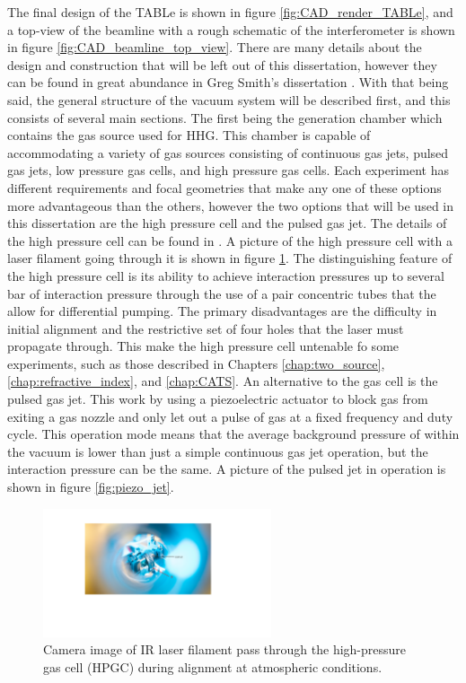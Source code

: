 The final design of the TABLe is shown in figure \ref{fig:CAD_render_TABLe}, and a top-view of the beamline with a rough schematic of the interferometer is shown in figure \ref{fig:CAD_beamline_top_view}. There are many details about the design and construction that will be left out of this dissertation, however they can be found in great abundance in Greg Smith's dissertation \cite{smithApplicationAttosecondTechniques2020}.  With that being said, the general structure of the vacuum system will be described first, and this consists of several main sections.  The first being the generation chamber which contains the gas source used for HHG.  This chamber is capable of accommodating a variety of gas sources consisting of continuous gas jets, pulsed gas jets, low pressure gas cells, and high pressure gas cells.  Each experiment has different requirements and focal geometries that make any one of these options more advantageous than the others, however the two options that will be used in this dissertation are the high pressure cell and the pulsed gas jet.  The details of the high pressure cell can be found in \cite{smithApplicationAttosecondTechniques2020}.  A picture of the high pressure cell with a laser filament going through it is shown in figure \ref{fig:HPGC_filament}.  The distinguishing feature of the high pressure cell is its ability to achieve interaction pressures up to several bar of interaction pressure through the use of a pair concentric tubes that the allow for differential pumping.  The primary disadvantages are the difficulty in initial alignment and the restrictive set of four holes that the laser must propagate through.  This make the high pressure cell untenable fo some experiments, such as those described in Chapters \ref{chap:two_source}, \ref{chap:refractive_index}, and \ref{chap:CATS}.  An alternative to the gas cell is the pulsed gas jet.  This work by using a piezoelectric actuator to block gas from exiting a gas nozzle and only let out a pulse of gas at a fixed frequency and duty cycle.  This operation mode means that the average background pressure of within the vacuum is lower than just a simple continuous gas jet operation, but the interaction pressure can be the same.  A picture of the pulsed jet in operation is shown in figure \ref{fig:piezo_jet}.
\label{sec:gas_source}
\begin{figure}
	\centering
	\includegraphics[width=0.6\textwidth]{figures/Beamline/HPGC.pdf}
	\caption[Image of laser passing through HPGC]{Camera image of IR laser filament pass through the high-pressure gas cell (HPGC) during alignment at atmospheric conditions.}
	\label{fig:HPGC_filament}
\end{figure}


